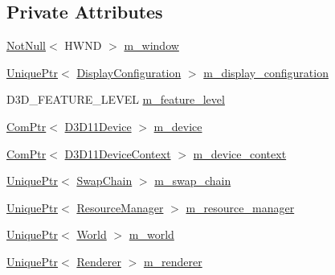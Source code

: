 \subsection*{Private Attributes}
\begin{DoxyCompactItemize}
\item 
\hyperlink{namespacemage_a8769f9d670d6b585ea306cb1062af94b}{Not\+Null}$<$ H\+W\+ND $>$ \hyperlink{classmage_1_1rendering_1_1_manager_1_1_impl_a9e08221306f4931b1da16fe5b021a5e8}{m\+\_\+window}
\item 
\hyperlink{namespacemage_a3316d7143a973e37adf1110f2e80ca31}{Unique\+Ptr}$<$ \hyperlink{classmage_1_1rendering_1_1_display_configuration}{Display\+Configuration} $>$ \hyperlink{classmage_1_1rendering_1_1_manager_1_1_impl_aa1a9ba866795d4497a0d43dac4b0188d}{m\+\_\+display\+\_\+configuration}
\item 
D3\+D\+\_\+\+F\+E\+A\+T\+U\+R\+E\+\_\+\+L\+E\+V\+EL \hyperlink{classmage_1_1rendering_1_1_manager_1_1_impl_afdf5967267574a49bba12f5478ba6325}{m\+\_\+feature\+\_\+level}
\item 
\hyperlink{namespacemage_ae74f374780900893caa5555d1031fd79}{Com\+Ptr}$<$ \hyperlink{namespacemage_1_1rendering_a7081b2c6e923fac0d42ff4862dc4a823}{D3\+D11\+Device} $>$ \hyperlink{classmage_1_1rendering_1_1_manager_1_1_impl_aa53fc50439eb2fefbc770440f65eae8a}{m\+\_\+device}
\item 
\hyperlink{namespacemage_ae74f374780900893caa5555d1031fd79}{Com\+Ptr}$<$ \hyperlink{namespacemage_1_1rendering_a4b23dd00d80ca4f6856375936261a13d}{D3\+D11\+Device\+Context} $>$ \hyperlink{classmage_1_1rendering_1_1_manager_1_1_impl_a4d65858be32aeb40527033cb0afd0911}{m\+\_\+device\+\_\+context}
\item 
\hyperlink{namespacemage_a3316d7143a973e37adf1110f2e80ca31}{Unique\+Ptr}$<$ \hyperlink{classmage_1_1rendering_1_1_swap_chain}{Swap\+Chain} $>$ \hyperlink{classmage_1_1rendering_1_1_manager_1_1_impl_a6cdd4855cd9c0681ef0b3a5e4f44ad81}{m\+\_\+swap\+\_\+chain}
\item 
\hyperlink{namespacemage_a3316d7143a973e37adf1110f2e80ca31}{Unique\+Ptr}$<$ \hyperlink{classmage_1_1rendering_1_1_resource_manager}{Resource\+Manager} $>$ \hyperlink{classmage_1_1rendering_1_1_manager_1_1_impl_a3775faa73581e535e207155e4fa09846}{m\+\_\+resource\+\_\+manager}
\item 
\hyperlink{namespacemage_a3316d7143a973e37adf1110f2e80ca31}{Unique\+Ptr}$<$ \hyperlink{classmage_1_1rendering_1_1_world}{World} $>$ \hyperlink{classmage_1_1rendering_1_1_manager_1_1_impl_ad262b9528ae867db6fe8b93b8de54cf1}{m\+\_\+world}
\item 
\hyperlink{namespacemage_a3316d7143a973e37adf1110f2e80ca31}{Unique\+Ptr}$<$ \hyperlink{classmage_1_1rendering_1_1_renderer}{Renderer} $>$ \hyperlink{classmage_1_1rendering_1_1_manager_1_1_impl_aa15b0df6ab64a8c03cd4aa23cb78adb4}{m\+\_\+renderer}
\end{DoxyCompactItemize}


